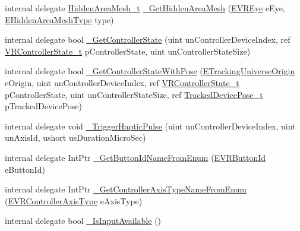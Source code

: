 \begin{DoxyCompactItemize}
internal delegate \mbox{\hyperlink{struct_valve_1_1_v_r_1_1_hidden_area_mesh__t}{Hidden\+Area\+Mesh\+\_\+t}} \mbox{\hyperlink{struct_valve_1_1_v_r_1_1_i_v_r_system_a2778354bdfffa5063ed74f2634feb02d}{\+\_\+\+Get\+Hidden\+Area\+Mesh}} (\mbox{\hyperlink{namespace_valve_1_1_v_r_a8153d4a3e627e1cede046327087c1880}{E\+V\+R\+Eye}} e\+Eye, \mbox{\hyperlink{namespace_valve_1_1_v_r_a2ed1af4858f23bc73d7358e8fcde5c64}{E\+Hidden\+Area\+Mesh\+Type}} type)
\item 
internal delegate bool \mbox{\hyperlink{struct_valve_1_1_v_r_1_1_i_v_r_system_a1eca77760e6464488c6ca3e083e0a456}{\+\_\+\+Get\+Controller\+State}} (uint un\+Controller\+Device\+Index, ref \mbox{\hyperlink{struct_valve_1_1_v_r_1_1_v_r_controller_state__t}{V\+R\+Controller\+State\+\_\+t}} p\+Controller\+State, uint un\+Controller\+State\+Size)
\item 
internal delegate bool \mbox{\hyperlink{struct_valve_1_1_v_r_1_1_i_v_r_system_ad69cca720213c448e77167bb46b1a804}{\+\_\+\+Get\+Controller\+State\+With\+Pose}} (\mbox{\hyperlink{namespace_valve_1_1_v_r_a29be99a3c2f780157bd490db06a7f12f}{E\+Tracking\+Universe\+Origin}} e\+Origin, uint un\+Controller\+Device\+Index, ref \mbox{\hyperlink{struct_valve_1_1_v_r_1_1_v_r_controller_state__t}{V\+R\+Controller\+State\+\_\+t}} p\+Controller\+State, uint un\+Controller\+State\+Size, ref \mbox{\hyperlink{struct_valve_1_1_v_r_1_1_tracked_device_pose__t}{Tracked\+Device\+Pose\+\_\+t}} p\+Tracked\+Device\+Pose)
\item 
internal delegate void \mbox{\hyperlink{struct_valve_1_1_v_r_1_1_i_v_r_system_a7d878e9f5dd86b552a79017e9b265b72}{\+\_\+\+Trigger\+Haptic\+Pulse}} (uint un\+Controller\+Device\+Index, uint un\+Axis\+Id, ushort us\+Duration\+Micro\+Sec)
\item 
internal delegate Int\+Ptr \mbox{\hyperlink{struct_valve_1_1_v_r_1_1_i_v_r_system_a0a9463bae6cfe3289f8b18e79db1dbb4}{\+\_\+\+Get\+Button\+Id\+Name\+From\+Enum}} (\mbox{\hyperlink{namespace_valve_1_1_v_r_a43fd11be1f2f7596cbb480b4a5dc2e87}{E\+V\+R\+Button\+Id}} e\+Button\+Id)
\item 
internal delegate Int\+Ptr \mbox{\hyperlink{struct_valve_1_1_v_r_1_1_i_v_r_system_aa41d19dc0a8ab0539fef127d02dd471a}{\+\_\+\+Get\+Controller\+Axis\+Type\+Name\+From\+Enum}} (\mbox{\hyperlink{namespace_valve_1_1_v_r_aaccda1681e581ff46f9d883a8b574a66}{E\+V\+R\+Controller\+Axis\+Type}} e\+Axis\+Type)
\item 
internal delegate bool \mbox{\hyperlink{struct_valve_1_1_v_r_1_1_i_v_r_system_ae830dd893c1ac74196be24544e94f9ca}{\+\_\+\+Is\+Input\+Available}} ()

\end{DoxyCompactItemize}
